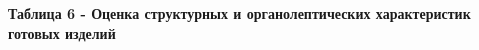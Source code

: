 {{{%

{\bfseries Таблица 6 - Оценка структурных и органолептических характеристик
готовых изделий}


}}}
